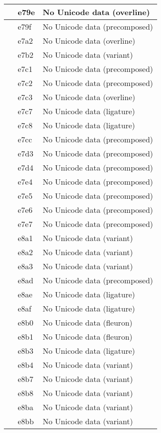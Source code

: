 \documentclass[12pt,letterpaper,openany]{book}
\begin{document}
\begin{center}
\begin{supertabular}{|m{0.25in}|m{0.5in}|m{4in}|}
 & e79e & No Unicode data (overline)\\\hline
 & e79f & No Unicode data (precomposed)\\\hline
 & e7a2 & No Unicode data (overline)\\\hline
 & e7b2 & No Unicode data (variant)\\\hline
 & e7c1 & No Unicode data (precomposed)\\\hline
 & e7c2 & No Unicode data (precomposed)\\\hline
 & e7c3 & No Unicode data (overline)\\\hline
 & e7c7 & No Unicode data (ligature)\\\hline
 & e7c8 & No Unicode data (ligature)\\\hline
 & e7cc & No Unicode data (precomposed)\\\hline
 & e7d3 & No Unicode data (precomposed)\\\hline
 & e7d4 & No Unicode data (precomposed)\\\hline
 & e7e4 & No Unicode data (precomposed)\\\hline
 & e7e5 & No Unicode data (precomposed)\\\hline
 & e7e6 & No Unicode data (precomposed)\\\hline
 & e7e7 & No Unicode data (precomposed)\\\hline
 & e8a1 & No Unicode data (variant)\\\hline
 & e8a2 & No Unicode data (variant)\\\hline
 & e8a3 & No Unicode data (variant)\\\hline
 & e8ad & No Unicode data (precomposed)\\\hline
 & e8ae & No Unicode data (ligature)\\\hline
 & e8af & No Unicode data  (ligature)\\\hline
 & e8b0 & No Unicode data (fleuron)\\\hline
 & e8b1 & No Unicode data (fleuron)\\\hline
 & e8b3 & No Unicode data (ligature)\\\hline
 & e8b4 & No Unicode data (variant)\\\hline
 & e8b7 & No Unicode data (variant)\\\hline
 & e8b8 & No Unicode data (variant)\\\hline
 & e8ba & No Unicode data (variant)\\\hline
 & e8bb & No Unicode data (variant)\\\hline

\end{supertabular}
\end{center}
\end{document}
